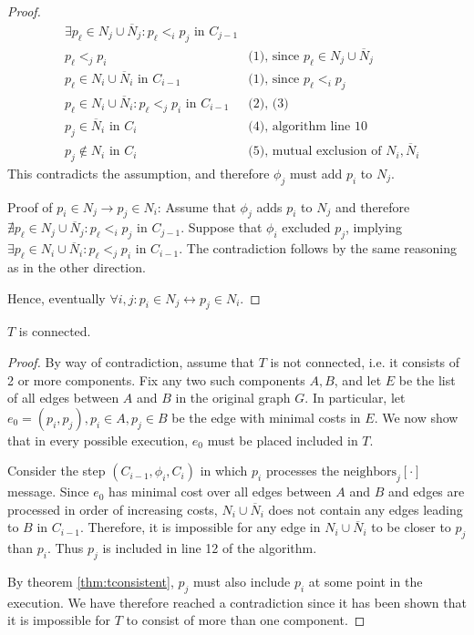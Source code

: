 \begin{proof}
\begin{align}
&\exists p_\ell \in N_j \cup \overline{N}_j: p_\ell <_i p_j \text{ in } C_{j-1} & \\
&p_\ell <_j p_i & \text{(1), since } p_\ell \in N_j \cup \overline{N}_j \\
&p_\ell \in N_i \cup \overline{N}_i \text{ in } C_{i-1} & \text{(1), since } p_\ell <_i p_j \\
&p_\ell \in N_i \cup \overline{N}_i: p_\ell <_j p_i \text{ in } C_{i-1} & \text{(2), (3)} \\
&p_j \in \overline{N}_i \text{ in } C_i & \text{(4), algorithm line 10} \\
&p_j \not\in N_i \text{ in } C_i & \text{(5), mutual exclusion of } N_i, \overline{N}_i
\end{align}
This contradicts the assumption, and therefore $\phi_j$ must add $p_i$ to $N_j$.

Proof of $p_i \in N_j \rightarrow p_j \in N_i$: Assume that $\phi_j$ adds
$p_i$ to $N_j$ and therefore $\nexists p_\ell \in N_j \cup \overline{N}_j: 
p_\ell <_i p_j$ in $C_{j-1}$. Suppose that $\phi_i$ excluded $p_j$, implying
$\exists p_\ell \in N_i \cup \overline{N}_i: p_\ell <_j p_i \text{ in } C_{i-1}$.
The contradiction follows by the same reasoning as in the other direction.

Hence, eventually $\forall i,j: p_i \in N_j \leftrightarrow p_j \in N_i$.
\end{proof}

\begin{theorem}
$T$ is connected.
\end{theorem}

\begin{proof}
By way of contradiction, assume that $T$ is not connected, i.e. it consists of 2
or more components. Fix any two such components $A, B$, and let $E$ be the list
of all edges between $A$ and $B$ in the original graph $G$. In particular, let
$e_0 = (p_i, p_j), p_i \in A, p_j \in B$ be the edge with minimal costs in $E$.
We now show that in every 
possible execution, $e_0$ must be placed included in $T$.

Consider the step $(C_{i-1}, \phi_i, C_i)$ in which $p_i$ processes the 
$\text{neighbors}_j[\cdot]$ message. Since $e_0$ has minimal cost over all edges
between $A$ and $B$ and edges are processed in order of increasing costs,
$N_i \cup \overline{N}_i$ does not contain any edges
leading to $B$ in $C_{i-1}$. Therefore, it is impossible for any edge in 
$N_i \cup \overline{N}_i$ to be closer to $p_j$ than $p_i$. Thus $p_j$
is included in line 12 of the algorithm.

By theorem \ref{thm:tconsistent}, $p_j$ must also include $p_i$ at some point
in the execution. We have therefore reached a contradiction since it has been
shown that it is impossible for $T$ to consist of more than one component.
\end{proof}

